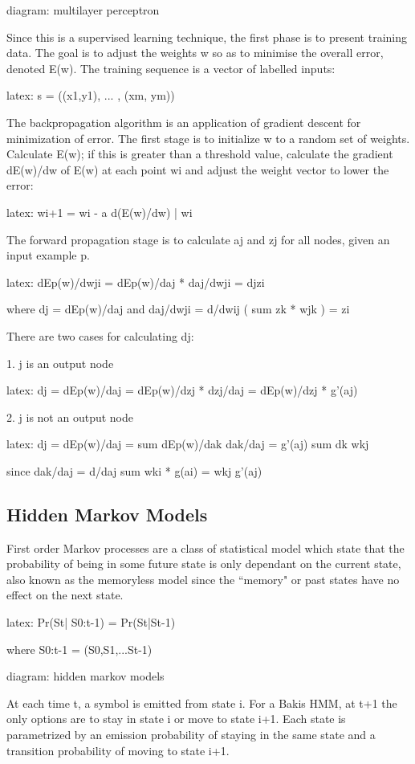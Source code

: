 \documentclass[12pt,a4,notitlepage]{report}
\renewcommand{\_}{\texttt{\symbol{95}}}
\newcommand{\<}{\texttt{\symbol{60}}}
\renewcommand{\>}{\texttt{\symbol{62}}}
\begin{document}
{diagram: multilayer perceptron}

Since this is a supervised learning technique, the first phase is to present training data. The goal is to adjust the weights w so as to minimise the overall error, denoted E(w). The training sequence is a vector of labelled inputs:

{latex:
s = ((x1,y1), ... , (xm, ym))
}

The backpropagation algorithm is an application of gradient descent for minimization of error. The first stage is to initialize w to a random set of weights. Calculate E(w); if this is greater than a threshold value, calculate the gradient dE(w)/dw of E(w) at each point wi and adjust the weight vector to lower the error:

{latex:
wi+1 = wi - a d(E(w)/dw) | wi
}

The forward propagation stage is to calculate aj and zj for all nodes, given an input example p.

{latex:
dEp(w)/dwji = dEp(w)/daj * daj/dwji = djzi

where dj = dEp(w)/daj
and daj/dwji = d/dwij ( sum {zk * wjk} ) = zi
}

There are two cases for calculating dj:

1. j is an output node

{latex:
dj = dEp(w)/daj
 = dEp(w)/dzj * dzj/daj
 = dEp(w)/dzj * g'(aj)
}

2. j is not an output node

{latex:
dj = dEp(w)/daj
 = sum { dEp(w)/dak dak/daj }
 = g'(aj) sum {dk wkj}
 
since 
dak/daj = d/daj sum { wki * g(ai) }
 = wkj g'(aj)
}

\subsection{Hidden Markov Models}

First order Markov processes are a class of statistical model which state that the probability of being in some future state is only dependant on the current state, also known as the memoryless model since the ``memory" or past states have no effect on the next state.

{latex:
Pr(St| S0:t-1) = Pr(St|St-1)

where S0:t-1 = (S0,S1,...St-1)
}

{diagram: hidden markov models}

At each time t, a symbol is emitted from state i. For a Bakis HMM, at t+1 the only options are to stay in state i or move to state i+1. Each state is parametrized by an emission probability of staying in the same state and a transition probability of moving to state i+1.
\end{document}
